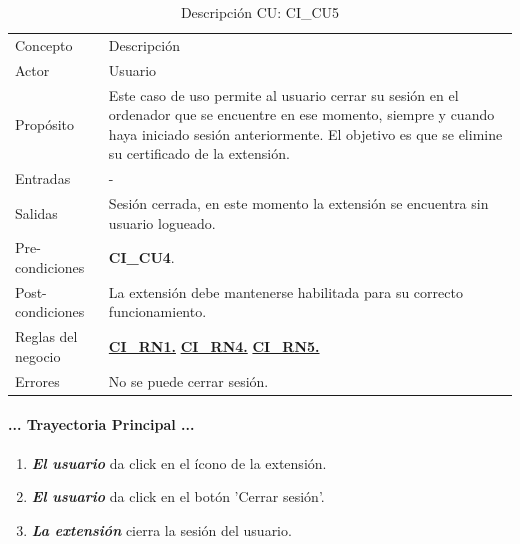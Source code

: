 \documentclass[12pt, a4paper, titlepage]{report}
\begin{document}
			    
				\begin{table}[H]
    				\begin{tabular}{ |p{3.5cm}||p{9.5cm}|}
    					\hline
    					\rowcolor{guindapoli}
    					\multicolumn{2}{|c|}{\textbf{\textcolor{white}{Caso de uso: CI\_CU5. Cerrar sesión en la extensión.}}}\\
    					\hline
    					\rowcolor{azulfuerte}Concepto & Descripción\\
    					\hline
    					\cellcolor{azulclaro}Actor & 
    					Usuario\\ 
    					\hline
    					\cellcolor{azulclaro}Propósito &
    					Este caso de uso permite al usuario cerrar su sesión en el ordenador que se encuentre en ese momento, siempre y cuando haya iniciado sesión anteriormente. El objetivo es que se elimine su certificado de la extensión.\\
    					\hline
    					\cellcolor{azulclaro}Entradas &
    					-\\
    					\hline
    					\cellcolor{azulclaro}Salidas &
    					Sesión cerrada, en este momento la extensión se encuentra sin usuario logueado.\\
    					\hline
    					\cellcolor{azulclaro}Pre-condiciones&
    					\textbf{CI\_CU4}.\\
    					\hline
    					\cellcolor{azulclaro}Post-condiciones&
    					La extensión debe mantenerse habilitada para su correcto funcionamiento.\\
    					\hline
    					\cellcolor{azulclaro}Reglas del negocio&
    					\hyperref[CI_RN1]{\textbf{CI\_RN1.}} \newline \hyperref[CI_RN4]{\textbf{CI\_RN4.}} \newline
    					\hyperref[CI_RN5]{\textbf{CI\_RN5.}}\\
    					\hline
    					\cellcolor{azulclaro}Errores &
    					No se puede cerrar sesión.
    					\\					
    					\hline
    				\end{tabular}
				\caption[DCU: CI\_CU5]{Descripción CU: CI\_CU5}
				\end{table}
				
				\paragraph{... Trayectoria Principal ...}
				\begin{enumerate}
				
					\item \textbf{\textit{El usuario}} da click en el ícono de la extensión.
					
					\item \textbf{\textit{El usuario}} da click en el botón 'Cerrar sesión'.
					
					\item \textbf{\textit{La extensión}} cierra la sesión del usuario.
					
				\end{enumerate}
\end{document}
